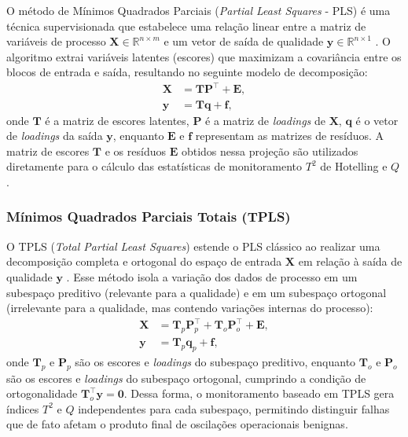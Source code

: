 \documentclass[journal]{IEEEtran}
\begin{document}
O método de Mínimos Quadrados Parciais (\textit{Partial Least Squares} - PLS) é uma técnica supervisionada que estabelece uma relação linear entre a matriz de variáveis de processo $\mathbf{X} \in \mathbb{R}^{n \times m}$ e um vetor de saída de qualidade $\mathbf{y} \in \mathbb{R}^{n \times 1}$ \cite{dayal1997}. O algoritmo extrai variáveis latentes (escores) que maximizam a covariância entre os blocos de entrada e saída, resultando no seguinte modelo de decomposição:
\begin{align}
\mathbf{X} &= \mathbf{T} \mathbf{P}^\top + \mathbf{E}, \label{eq:pls_x}\\
\mathbf{y} &= \mathbf{T} \mathbf{q} + \mathbf{f}, \label{eq:pls_y}
\end{align}
onde $\mathbf{T}$ é a matriz de escores latentes, $\mathbf{P}$ é a matriz de \textit{loadings} de $\mathbf{X}$, $\mathbf{q}$ é o vetor de \textit{loadings} da saída $\mathbf{y}$, enquanto $\mathbf{E}$ e $\mathbf{f}$ representam as matrizes de resíduos. A matriz de escores $\mathbf{T}$ e os resíduos $\mathbf{E}$ obtidos nessa projeção são utilizados diretamente para o cálculo das estatísticas de monitoramento $T^2$ de Hotelling e $Q$.

\subsubsection{Mínimos Quadrados Parciais Totais (TPLS)}

O TPLS (\textit{Total Partial Least Squares}) estende o PLS clássico ao realizar uma decomposição completa e ortogonal do espaço de entrada $\mathbf{X}$ em relação à saída de qualidade $\mathbf{y}$ \cite{zhou2010}. Esse método isola a variação dos dados de processo em um subespaço preditivo (relevante para a qualidade) e em um subespaço ortogonal (irrelevante para a qualidade, mas contendo variações internas do processo):
\begin{align}
\mathbf{X} &= \mathbf{T}_p \mathbf{P}_p^\top + \mathbf{T}_o \mathbf{P}_o^\top + \mathbf{E}, \label{eq:tpls_x}\\
\mathbf{y} &= \mathbf{T}_p \mathbf{q}_p + \mathbf{f}, \label{eq:tpls_y}
\end{align}
onde $\mathbf{T}_p$ e $\mathbf{P}_p$ são os escores e \textit{loadings} do subespaço preditivo, enquanto $\mathbf{T}_o$ e $\mathbf{P}_o$ são os escores e \textit{loadings} do subespaço ortogonal, cumprindo a condição de ortogonalidade $\mathbf{T}_o^\top \mathbf{y} = \mathbf{0}$. Dessa forma, o monitoramento baseado em TPLS gera índices $T^2$ e $Q$ independentes para cada subespaço, permitindo distinguir falhas que de fato afetam o produto final de oscilações operacionais benignas.
\end{document}
